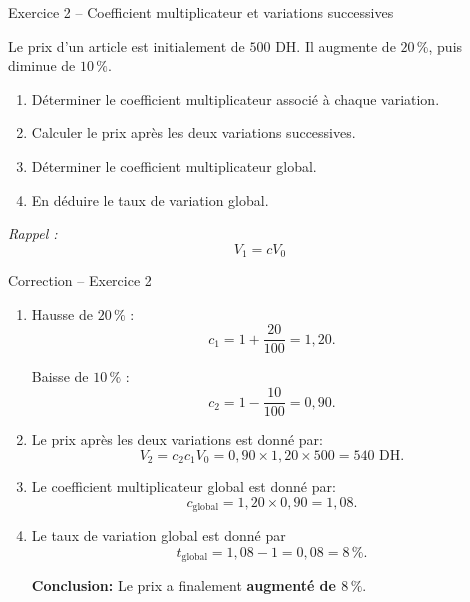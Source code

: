 \documentclass[aspectratio=169,11pt]{beamer}
\begin{document}
\begin{frame}{Exercice 2 -- Coefficient multiplicateur et variations successives}
	
	Le prix d'un article est initialement de $500$ DH.
	Il augmente de $20\,\%$, puis diminue de $10\,\%$.
	
	\begin{enumerate}
		\item Déterminer le coefficient multiplicateur associé
		à chaque variation.
		
		\item Calculer le prix après les deux variations successives.
		
		\item Déterminer le coefficient multiplicateur global.
		
		\item En déduire le taux de variation global.
	\end{enumerate}
	
	\vfill
	
	\begin{center}
		\textit{Rappel :}\qquad
		\[
		V_1=cV_0
		\]
	\end{center}
	
\end{frame}


\begin{frame}{Correction -- Exercice 2}
	\begin{enumerate}
		
		\item 
		
		Hausse de $20\,\%$ :
		\[
		c_1=1+\frac{20}{100}=1{,}20.
		\]
		
		Baisse de $10\,\%$ :
		\[
		c_2=1-\frac{10}{100}=0{,}90.
		\]
		
		\item Le prix après les deux variations est donné par: 
		\vspace{-0.3cm}
		\[
		V_2=c_2c_1V_0
		=0{,}90\times1{,}20\times500
		=\boxed{540\text{ DH}}.
		\]
		
		\item Le coefficient multiplicateur global est donné par: 
		\vspace{-0.3cm}
		\[
		c_{\mathrm{global}}
		=1{,}20\times0{,}90
		=\boxed{1{,}08}.
		\]
		
		\item Le taux de variation global est donné par
		\vspace{-0.3cm}
		\[
		t_{\mathrm{global}}=1{,}08-1
		=\boxed{0{,}08=8\,\%}.
		\]
		
		\textbf{Conclusion:} Le prix a finalement \textbf{augmenté de $8\,\%$}.
		
	\end{enumerate}
	
\end{frame}
\end{document}
